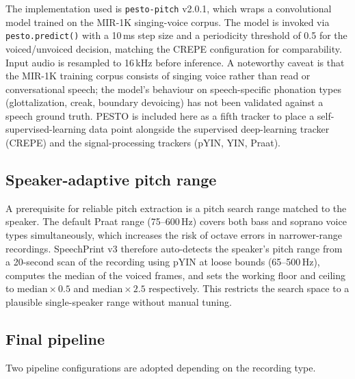\begin{enumerate}
      The implementation used is \texttt{pesto-pitch} v2.0.1, which wraps a
      convolutional model trained on the MIR-1K singing-voice corpus. The model
      is invoked via \texttt{pesto.predict()} with a 10\,ms step size and a
      periodicity threshold of 0.5 for the voiced/unvoiced decision, matching the
      CREPE configuration for comparability. Input audio is resampled to 16\,kHz
      before inference. A noteworthy caveat is that the MIR-1K training corpus
      consists of singing voice rather than read or conversational speech; the
      model's behaviour on speech-specific phonation types (glottalization,
      creak, boundary devoicing) has not been validated against a speech ground
      truth. PESTO is included here as a fifth tracker to place a
      self-supervised-learning data point alongside the supervised deep-learning
      tracker (CREPE) and the signal-processing trackers (pYIN, YIN, Praat).

\end{enumerate}

\subsection{Speaker-adaptive pitch range}

A prerequisite for reliable pitch extraction is a pitch search range matched to
the speaker. The default Praat range (75--600\,Hz) covers both bass and soprano
voice types simultaneously, which increases the risk of octave errors in
narrower-range recordings. SpeechPrint v3 therefore auto-detects the speaker's
pitch range from a 20-second scan of the recording using pYIN at loose bounds
(65--500\,Hz), computes the median of the voiced frames, and sets the working
floor and ceiling to $\text{median} \times 0.5$ and $\text{median} \times 2.5$
respectively. This restricts the search space to a plausible single-speaker range
without manual tuning.

\subsection{Final pipeline}

Two pipeline configurations are adopted depending on the recording type.

